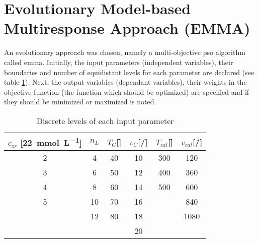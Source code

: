 \section{Evolutionary Model-based Multiresponse Approach (EMMA)}
\label{sec:ss}
An evolutionary approach was chosen, namely a multi-objective 
\gls{pso} algorithm called \gls{emma}\cite{villanova2010function,Kennedy1995,Breiman1997,Carta2011}.
%
%
Initially, the input parameters (independent variables), their boundaries and number of equidistant levels for each parameter are declared (see table \ref{tab:input}).
Next, the output variables (dependant variables), their weights in the objective function (the function which should be optimized) are specified and if they should be minimized or maximized is noted.
%
\begin{table}[htb]
	\centering
	\begin{tabular}{cc cc cc}
		\hline\hline
        $c_{zr}$ [\SI{22}{\milli\mol\per\liter}]	&$n_L$	&$T_{C}$[\oc{}]	&$v_{C}$[\mm{}/\s{}]	&$T_{cal}$[\oc{}]	&$v_{cal}$[\oc{}/\h{}]	\\
		\hline
		2				&4		&40					&10				&300				&120	\\
		3				&6		&50					&12				&400				&360	\\
		4				&8		&60					&14				&500				&600	\\
		5				&10		&70					&16				&					&840	\\
						&12		&80					&18				&					&1080	\\
						&		&					&20				&					&		\\
		\hline\hline
	\end{tabular}
	\caption{Discrete levels of each input parameter }
	\label{tab:input}
\end{table}


